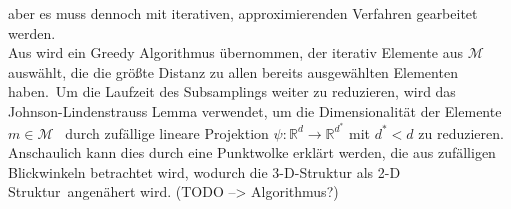 aber es muss dennoch mit iterativen, approximierenden Verfahren gearbeitet werden.\\
Aus \cite{sener2018active} wird ein \glqq Greedy Algorithmus\grqq{} übernommen, der iterativ Elemente aus $\mathcal{M}$ auswählt, die die größte Distanz zu allen bereits ausgewählten Elementen haben.\
Um die Laufzeit des Subsamplings weiter zu reduzieren, wird das \glqq Johnson-Lindenstrauss Lemma\grqq{}\cite{johnsonlindenstrauss} verwendet, um die Dimensionalität der Elemente $m\in\mathcal{M}$ \ 
durch zufällige lineare Projektion $\psi: \mathbb{R}^{d} \rightarrow \mathbb{R}^{d^{*}}$ mit $d^{*}<d$ zu reduzieren. Anschaulich kann dies durch eine Punktwolke erklärt werden, die aus zufälligen Blickwinkeln betrachtet wird, wodurch die 3-D-Struktur als 2-D Struktur\
angenähert wird. (TODO --> Algorithmus?)\\

